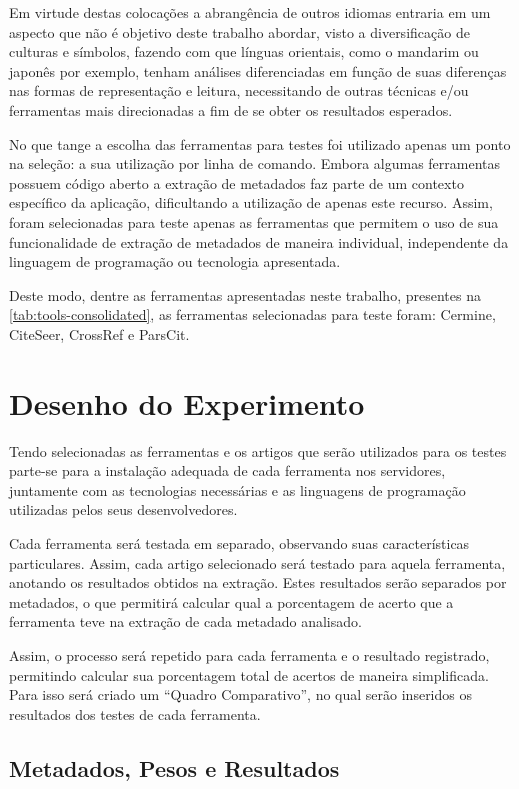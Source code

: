 Em virtude destas colocações a abrangência de outros idiomas entraria em um aspecto que não é objetivo deste trabalho abordar, visto a diversificação de culturas e símbolos, fazendo com que línguas orientais, como o mandarim ou japonês por exemplo, tenham análises diferenciadas em função de suas diferenças nas formas de representação e leitura, necessitando de outras técnicas e/ou ferramentas mais direcionadas a fim de se obter os resultados esperados.

No que tange a escolha das ferramentas para testes foi utilizado apenas um ponto na seleção: a sua utilização por linha de comando. Embora algumas ferramentas possuem código aberto a extração de metadados faz parte de um contexto específico da aplicação, dificultando a utilização de apenas este recurso. Assim, foram selecionadas para teste apenas as ferramentas que permitem o uso de sua funcionalidade de extração de metadados de maneira individual, independente da linguagem de programação ou tecnologia apresentada. 

Deste modo, dentre as ferramentas apresentadas neste trabalho, presentes na \autoref{tab:tools-consolidated}, as ferramentas selecionadas para teste foram: Cermine, CiteSeer, CrossRef e ParsCit.
    

\section{Desenho do Experimento}
\label{sec:experiment-design}

Tendo selecionadas as ferramentas e os artigos que serão utilizados para os testes parte-se para a instalação adequada de cada ferramenta nos servidores, juntamente com as tecnologias necessárias e as linguagens de programação utilizadas pelos seus desenvolvedores. 

Cada ferramenta será testada em separado, observando suas características particulares. Assim, cada artigo selecionado será testado para aquela ferramenta, anotando os resultados obtidos na extração. Estes resultados serão separados por metadados, o que permitirá calcular qual a porcentagem de acerto que a ferramenta teve na extração de cada metadado analisado.

Assim, o processo será repetido para cada ferramenta e o resultado registrado, permitindo calcular sua porcentagem total de acertos de maneira simplificada. Para isso será criado um ``Quadro Comparativo'', no qual serão inseridos os resultados dos testes de cada ferramenta. 

\subsection{Metadados, Pesos e Resultados}
\label{ssec:metadata-results}


